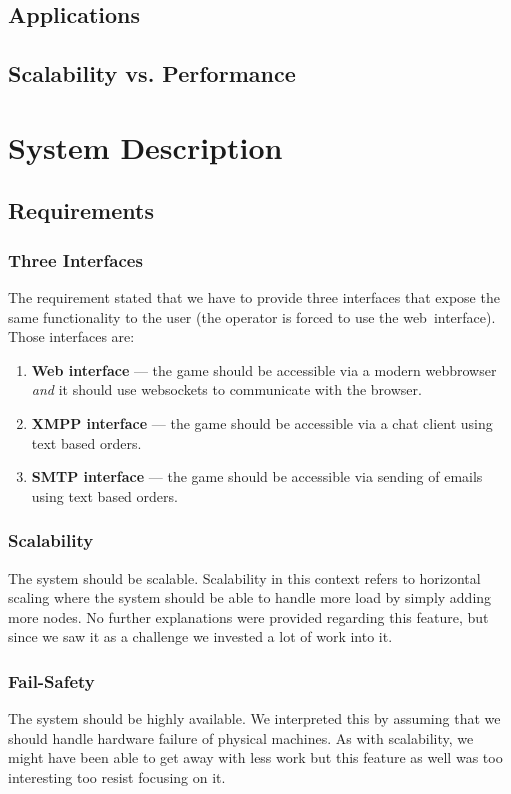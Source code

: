 \documentclass[11pt,a4paper]{report}
\newcommand{\hi}[1]{{\color{red}\em #1\/}\\}
\begin{document}
\section{Applications}
\section{Scalability vs. Performance}

\chapter{System Description}

\section{Requirements}

\subsection{Three Interfaces}
The requirement stated that we have to provide three interfaces that expose
the same functionality to the user (the operator is forced to use the
web~interface). Those interfaces are:\\
\begin{enumerate}
\item {\bf Web interface} ---
  the game should be accessible via a modern webbrowser {\em and\/} it should
  use websockets to communicate with the browser.
\item {\bf XMPP interface} --- 
  the game should be accessible via a chat client using text based orders.
\item {\bf SMTP interface} ---
  the game should be accessible via sending of emails using text based orders.
\end{enumerate}

\subsection{Scalability}
The system should be scalable. Scalability in this context refers to horizontal scaling where the system should be able to handle more load by simply adding more nodes. No further explanations were provided regarding this feature, but since we saw it as a challenge we invested a lot of work into it.

\subsection{Fail-Safety}
The system should be highly available. We interpreted this by assuming that we
should handle hardware failure of physical machines. As with scalability, we
might have been able to get away with less work but this feature as well was
too interesting too resist focusing on it.
\end{document}
